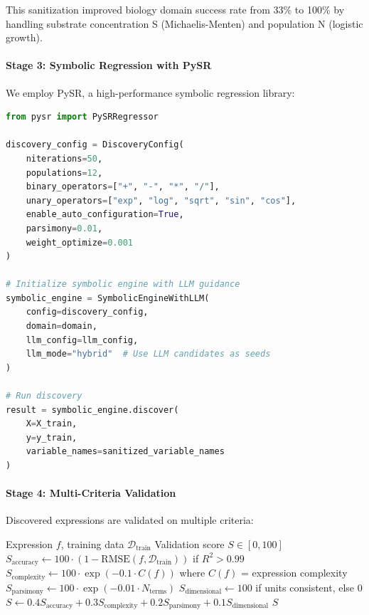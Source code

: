 This sanitization improved biology domain success rate from 33\% to 100\% by handling substrate concentration S (Michaelis-Menten) and population N (logistic growth).


\paragraph{Stage 3: Symbolic Regression with PySR}

We employ PySR, a high-performance symbolic regression library:

\begin{lstlisting}[language=Python, caption=Symbolic Regression Configuration]
from pysr import PySRRegressor

discovery_config = DiscoveryConfig(
    niterations=50,
    populations=12,
    binary_operators=["+", "-", "*", "/"],
    unary_operators=["exp", "log", "sqrt", "sin", "cos"],
    enable_auto_configuration=True,
    parsimony=0.01,
    weight_optimize=0.001
)

# Initialize symbolic engine with LLM guidance
symbolic_engine = SymbolicEngineWithLLM(
    config=discovery_config,
    domain=domain,
    llm_config=llm_config,
    llm_mode="hybrid"  # Use LLM candidates as seeds
)

# Run discovery
result = symbolic_engine.discover(
    X=X_train,
    y=y_train,
    variable_names=sanitized_variable_names
)
\end{lstlisting}

\paragraph{Stage 4: Multi-Criteria Validation}

Discovered expressions are validated on multiple criteria:

\begin{algorithm}[htbp]
\caption{Multi-Criteria Expression Validation}
\begin{algorithmic}[1]
\REQUIRE Expression $f$, training data $\mathcal{D}_{\text{train}}$
\ENSURE Validation score $S \in [0, 100]$
\STATE $S_{\text{accuracy}} \gets 100 \cdot (1 - \text{RMSE}(f, \mathcal{D}_{\text{train}}))$ if $R^2 > 0.99$
\STATE $S_{\text{complexity}} \gets 100 \cdot \exp(-0.1 \cdot C(f))$ where $C(f)$ = expression complexity
\STATE $S_{\text{parsimony}} \gets 100 \cdot \exp(-0.01 \cdot N_{\text{terms}})$
\STATE $S_{\text{dimensional}} \gets 100$ if units consistent, else $0$
\STATE $S \gets 0.4 S_{\text{accuracy}} + 0.3 S_{\text{complexity}} + 0.2 S_{\text{parsimony}} + 0.1 S_{\text{dimensional}}$
\RETURN $S$
\end{algorithmic}
\end{algorithm}

